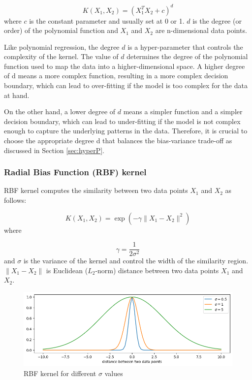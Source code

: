 \begin{equation}\label{eq:poly_kernel}
  K(X_1, X_2) = (X_1^T X_2 + c)^d
\end{equation} where $c$ is the constant parameter and usually set at 0 or 1. $d$ is the degree (or order) of the polynomial function and $X_1$ and $X_2$ are n-dimensional data points.

Like polynomial regression, the degree $d$ is a hyper-parameter that controls the complexity of the kernel. The value of $d$ determines the degree of the polynomial function used to map the data into a higher-dimensional space. A higher degree of d means a more complex function, resulting in a more complex decision boundary, which can lead to over-fitting if the model is too complex for the data at hand.

On the other hand, a lower degree of $d$ means a simpler function and a simpler decision boundary, which can lead to under-fitting if the model is not complex enough to capture the underlying patterns in the data. Therefore, it is crucial to choose the appropriate degree d that balances the bias-variance trade-off as discussed in Section \ref{sec:hyperP}.


\subsubsection{\textbf{Radial Bias Function (RBF) kernel}}
RBF kernel computes the similarity between two data points $X_1$ and $X_2$ as follows:

\begin{equation}\label{eq:rbf}
  K(X_1, X_2) = \exp(-\gamma\|X_1-X_2\|^2)
\end{equation} where

\begin{equation}\label{eq:gamma}
  \gamma = \frac{1}{2\sigma^2}
\end{equation}and $\sigma$ is the variance of the kernel and control the width of the similarity region. $\|X_1-X_2\|$ is Euclidean ($L_2$-norm) distance between two data points $X_1$ and $X_2$.

\begin{figure}[!h]
  \centering
  \includegraphics[width=8 cm]{kernel_dist.png}
  \caption{RBF kernel for different $\sigma$ values}
  \label{fig:kernel_d}
\end{figure}

